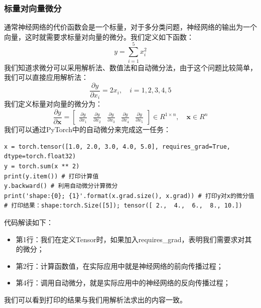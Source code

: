 \documentclass[UTF8]{article}
\begin{document}
\subsubsection{标量对向量微分}
通常神经网络的代价函数会是一个标量，对于多分类问题，神经网络的输出为一个向量，这时就需要求标量对向量的微分。我们定义如下函数：
\begin{equation}
y = \sum_{i=1}^{5} x_{i}^{2}
\label{autodif-func-param-tensor-1}
\end{equation}
我们知道求微分可以采用解析法、数值法和自动微分法，由于这个问题比较简单，我们可以直接应用解析法：
\begin{equation}
\frac{ \partial{y} }{ \partial{x_{i}} } = 2x_{i}, \quad i=1,2,3,4,5
\label{autodif-func-param-tensor-1-gradient}
\end{equation}
我们定义标量对向量的微分为：
\begin{equation}
\frac{ \partial{y} }{ \partial{ \boldsymbol{x} } } = \begin{bmatrix}
\frac{ \partial{y} }{ \partial{x_{1}} } & \frac{ \partial{y} }{ \partial{x_{2}} } & \frac{ \partial{y} }{ \partial{x_{3}} } & \frac{ \partial{y} }{ \partial{x_{4}} } & \frac{ \partial{y} }{ \partial{x_{5}} }
\end{bmatrix} \in R^{1 \times n}, \quad \boldsymbol{x} \in R^{n}
\label{autodif-scalar-vector-gradient-def}
\end{equation}
我们可以通过PyTorch中的自动微分来完成这一任务：
\begin{lstlisting}
x = torch.tensor([1.0, 2.0, 3.0, 4.0, 5.0], requires_grad=True, dtype=torch.float32)
y = torch.sum(x ** 2)
print(y.item()) # 打印计算值
y.backward() # 利用自动微分计算微分
print('shape:{0}; {1}'.format(x.grad.size(), x.grad)) # 打印y对x的微分值
# 打印结果：shape:torch.Size([5]); tensor([ 2.,  4.,  6.,  8., 10.])
\end{lstlisting}
代码解读如下：
\begin{itemize}
\item 第1行：我们在定义Tensor时，如果加入requires\_grad，表明我们需要求对其的微分；
\item 第2行：计算函数值，在实际应用中就是神经网络的前向传播过程；
\item 第4行：调用自动微分，就是实际应用中的神经网络的反向传播过程；
\end{itemize}
我们可以看到打印的结果与我们用解析法求出的内容一致。
\end{document}
